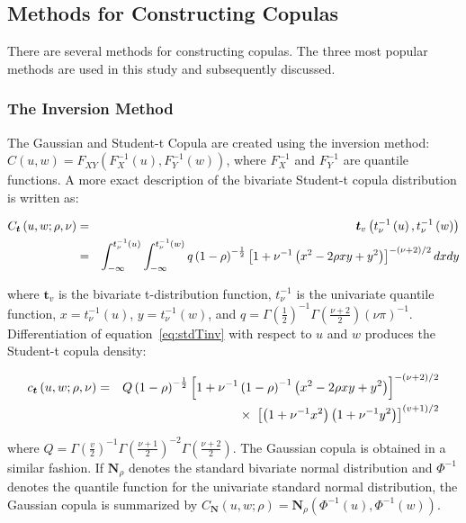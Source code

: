 \documentclass[12pt]{article}
\begin{document}
\subsection{Methods for Constructing Copulas}

There are several methods for constructing copulas. The three most popular methods are used in this study and subsequently discussed.

\subsubsection{The Inversion Method}

The Gaussian and Student-t Copula are created using the inversion method: $C\left(u,w\right) = F_{XY}\left(F_{X}^{-1}\left(u\right),F_{Y}^{-1}\left(w\right)\right)$, where $F_{X}^{-1}$ and $F_{Y}^{-1}$ are quantile functions. A more exact description of the bivariate Student-t copula distribution is written as:

\begin{eqnarray} \label{eq:stdTinv}
C_{\boldsymbol{t}}\left(u,w;\rho,\nu\right) &=& \boldsymbol{t}_{v}\left(t_{\nu}^{-1}\left(u\right), t_{\nu}^{-1}\left(w\right)\right) \\
&=& \int_{-\infty}^{t_{\nu}^{-1}\left(u\right)}\int_{-\infty}^{t_{\nu}^{-1}\left(w\right)}q\left(1-\rho\right)^{-\frac{1}{2}}\left[1+\nu^{-1}\left(x^{2}-2\rho xy + y^{2}\right)\right]^{-\left(\nu + 2\right)
/2}dxdy \notag
\end{eqnarray}

where $\boldsymbol{t}_{v}$ is the bivariate t-distribution function, $t_{\nu}^{-1}$ is the univariate quantile function, $x = t_{\nu}^{-1}\left(u\right)$, $y = t_{\nu }^{-1}\left(w\right)$, and $q = \Gamma\left(\frac{1}{2}\right)^{-1}\Gamma\left(\frac{\nu +2}{2}\right)\left(\nu\pi\right)^{-1}$. Differentiation of equation~\ref{eq:stdTinv} with respect to $u$ and $w$ produces the Student-t copula density:

\begin{eqnarray}
c_{\boldsymbol{t}}\left(u,w;\rho,\nu\right) &=& Q\left(1-\rho\right)^{-\frac{1}{2}}\left[1+\nu^{-1}\left(1-\rho\right)^{-1}\left(x^{2}-2\rho xy+y^{2}\right)\right]^{-\left(\nu +2\right)/2} \notag \\
&& \times~\left[\left(1+\nu^{-1}x^{2}\right)\left(1+\nu^{-1}y^{2}\right)\right]^{\left(v+1\right)/2}
\end{eqnarray}

where $Q=\Gamma\left(\frac{v}{2}\right)^{-1}\Gamma\left(\frac{\nu +1}{2}\right)^{-2}\Gamma\left(\frac{\nu +2}{2}\right)$. The Gaussian copula is obtained in a similar fashion. If $\boldsymbol{N}_{\rho}$ denotes the standard bivariate normal distribution and $\Phi^{-1}$ denotes the quantile function for the univariate standard normal distribution, the Gaussian copula is summarized by $C_{\boldsymbol{N}}\left(u,w;\rho\right) = \boldsymbol{N}_{\rho}\left(\Phi^{-1}\left(u\right),\Phi^{-1}\left(w\right)\right)$.
\end{document}
